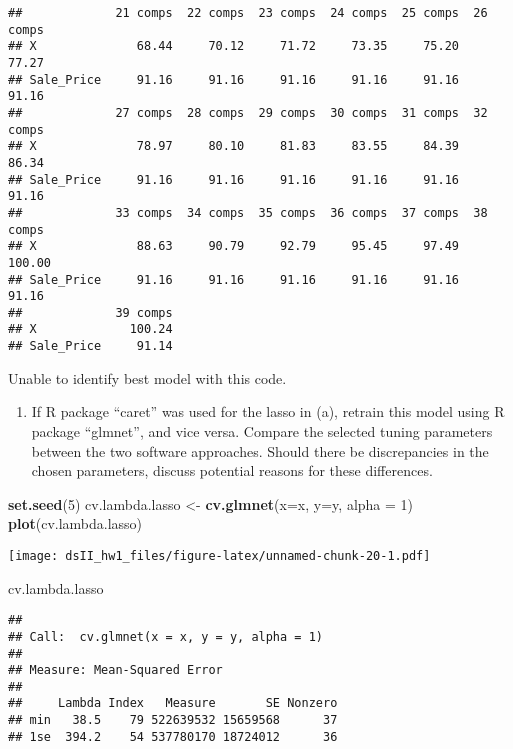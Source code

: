 \documentclass[
]{article}
\newenvironment{Shaded}{\begin{snugshade}}{\end{snugshade}}
\newcommand{\AttributeTok}[1]{\textcolor[rgb]{0.13,0.29,0.53}{#1}}
\newcommand{\DecValTok}[1]{\textcolor[rgb]{0.00,0.00,0.81}{#1}}
\newcommand{\FunctionTok}[1]{\textcolor[rgb]{0.13,0.29,0.53}{\textbf{#1}}}
\newcommand{\NormalTok}[1]{#1}
\newcommand{\OtherTok}[1]{\textcolor[rgb]{0.56,0.35,0.01}{#1}}
\providecommand{\tightlist}{%
  \setlength{\itemsep}{0pt}\setlength{\parskip}{0pt}}
\begin{document}
\begin{verbatim}
##             21 comps  22 comps  23 comps  24 comps  25 comps  26 comps
## X              68.44     70.12     71.72     73.35     75.20     77.27
## Sale_Price     91.16     91.16     91.16     91.16     91.16     91.16
##             27 comps  28 comps  29 comps  30 comps  31 comps  32 comps
## X              78.97     80.10     81.83     83.55     84.39     86.34
## Sale_Price     91.16     91.16     91.16     91.16     91.16     91.16
##             33 comps  34 comps  35 comps  36 comps  37 comps  38 comps
## X              88.63     90.79     92.79     95.45     97.49    100.00
## Sale_Price     91.16     91.16     91.16     91.16     91.16     91.16
##             39 comps
## X             100.24
## Sale_Price     91.14
\end{verbatim}

Unable to identify best model with this code.

\begin{enumerate}
\def\labelenumi{(\alph{enumi})}
\setcounter{enumi}{4}
\tightlist
\item
  If R package ``caret'' was used for the lasso in (a), retrain this
  model using R package ``glmnet'', and vice versa. Compare the selected
  tuning parameters between the two software approaches. Should there be
  discrepancies in the chosen parameters, discuss potential reasons for
  these differences.
\end{enumerate}

\begin{Shaded}
\begin{Highlighting}[]
\FunctionTok{set.seed}\NormalTok{(}\DecValTok{5}\NormalTok{)}
\NormalTok{cv.lambda.lasso }\OtherTok{\textless{}{-}} \FunctionTok{cv.glmnet}\NormalTok{(}\AttributeTok{x=}\NormalTok{x, }\AttributeTok{y=}\NormalTok{y, }
                         \AttributeTok{alpha =} \DecValTok{1}\NormalTok{) }
\FunctionTok{plot}\NormalTok{(cv.lambda.lasso)}
\end{Highlighting}
\end{Shaded}

\texttt{[image: dsII\_hw1\_files/figure-latex/unnamed-chunk-20-1.pdf]}

\begin{Shaded}
\begin{Highlighting}[]
\NormalTok{cv.lambda.lasso}
\end{Highlighting}
\end{Shaded}

\begin{verbatim}
## 
## Call:  cv.glmnet(x = x, y = y, alpha = 1) 
## 
## Measure: Mean-Squared Error 
## 
##     Lambda Index   Measure       SE Nonzero
## min   38.5    79 522639532 15659568      37
## 1se  394.2    54 537780170 18724012      36
\end{verbatim}
\end{document}
